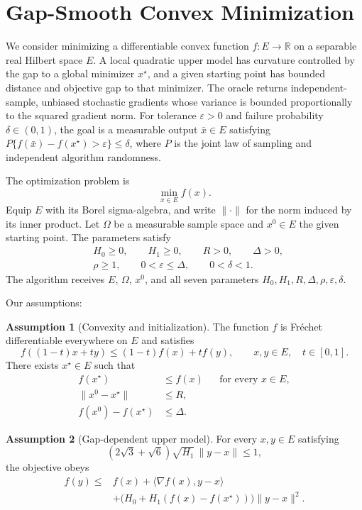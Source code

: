 \documentclass[10pt]{article}
\theoremstyle{definition}
\newtheorem{assumption}{Assumption}
\begin{document}
\section*{Gap-Smooth Convex Minimization}
We consider minimizing a differentiable convex function $f:E\to\mathbb{R}$ on a separable real Hilbert space $E$. A local quadratic upper model has curvature controlled by the gap to a global minimizer $x^\star$, and a given starting point has bounded distance and objective gap to that minimizer. The oracle returns independent-sample, unbiased stochastic gradients whose variance is bounded proportionally to the squared gradient norm. For tolerance $\varepsilon>0$ and failure probability $\delta\in(0,1)$, the goal is a measurable output $\bar{x}\in E$ satisfying $P\{f(\bar{x})-f(x^\star)>\varepsilon\}\leq\delta$, where $P$ is the joint law of sampling and independent algorithm randomness.

The optimization problem is
\[
\min_{x\in E} f(x).
\]
Equip $E$ with its Borel sigma-algebra, and write $\|\cdot\|$ for the norm induced by its inner product. Let $\Omega$ be a measurable sample space and $x^0\in E$ the given starting point. The parameters satisfy
\[
\begin{aligned}
&H_0\geq0,\qquad H_1\geq0,\qquad R>0,\qquad \Delta>0,\\
&\rho\geq1,\qquad 0<\varepsilon\leq\Delta,\qquad 0<\delta<1.
\end{aligned}
\]
The algorithm receives $E$, $\Omega$, $x^0$, and all seven parameters $H_0,H_1,R,\Delta,\rho,\varepsilon,\delta$.

Our assumptions:
\begin{assumption}[Convexity and initialization]
The function $f$ is Fr\'echet differentiable everywhere on $E$ and satisfies
\[
f((1-t)x+ty)\leq(1-t)f(x)+tf(y),
\qquad x,y\in E,\quad t\in[0,1].
\]
There exists $x^\star\in E$ such that
\[
\begin{aligned}
f(x^\star)&\leq f(x) &&\text{for every }x\in E,\\
\|x^0-x^\star\|&\leq R,\\
f(x^0)-f(x^\star)&\leq\Delta.
\end{aligned}
\]
\end{assumption}

\begin{assumption}[Gap-dependent upper model]
For every $x,y\in E$ satisfying
\[
(2\sqrt{3}+\sqrt{6})\sqrt{H_1}\,\|y-x\|\leq1,
\]
the objective obeys
\[
\begin{aligned}
f(y)\leq{}&f(x)+\langle\nabla f(x),y-x\rangle\\
&+\bigl(H_0+H_1(f(x)-f(x^\star))\bigr)\|y-x\|^2.
\end{aligned}
\]
\end{assumption}
\end{document}

